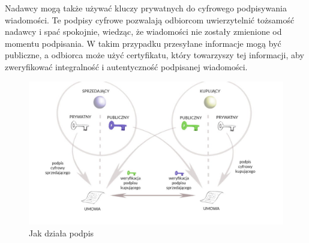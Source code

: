 \documentclass[a4paper,12pt,oneside]{book}
\begin{document}
Nadawcy mogą także używać kluczy prywatnych do cyfrowego podpisywania wiadomości. Te podpisy cyfrowe pozwalają odbiorcom uwierzytelnić tożsamość nadawcy i spać spokojnie, wiedząc, że wiadomości nie zostały zmienione od momentu podpisania. W takim przypadku przesyłane informacje mogą być publiczne, a odbiorca może użyć certyfikatu, który towarzyszy tej informacji, aby zweryfikować integralność i autentyczność podpisanej wiadomości.

\begin{figure}[h]
	\centering\includegraphics[scale=0.35]{krypt_asym_podpis.png}
	\caption{Jak działa podpis}
\end{figure}
	
\end{document}
